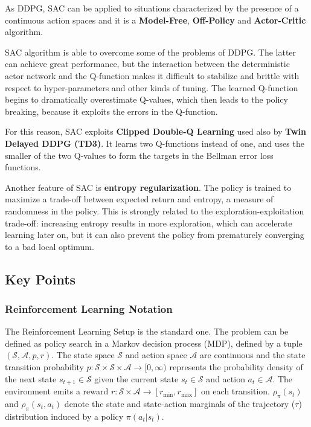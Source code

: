 \documentclass[a4paper, 11pt]{article}
\begin{document}
	As DDPG, SAC can be applied to situations characterized by the presence of a continuous action spaces and it is a \textbf{Model-Free}, \textbf{Off-Policy} and \textbf{Actor-Critic} algorithm.
	
	SAC algorithm is able to overcome some of the problems of DDPG.
	The latter can achieve great performance, but the interaction between the deterministic actor network and the Q-function makes it difficult to stabilize and brittle with respect to hyper-parameters and other kinds of tuning. The learned Q-function begins to dramatically overestimate Q-values, which then leads to the policy breaking, because it exploits the errors in the Q-function.
	
	For this reason, SAC exploits \textbf{Clipped Double-Q Learning} used also by \textbf{Twin Delayed DDPG (TD3)}. It learns two Q-functions instead of one, and uses the smaller of the two Q-values to form the targets in the Bellman error loss functions.
	
	Another feature of SAC is \textbf{entropy regularization}. The policy is trained to maximize a trade-off between expected return and entropy, a measure of randomness in the policy. This is strongly related to the exploration-exploitation trade-off: increasing entropy results in more exploration, which can accelerate learning later on, but it can also prevent the policy from prematurely converging to a bad local optimum.
	
	\subsection{Key Points}
	\subsubsection{Reinforcement Learning Notation}
	The Reinforcement Learning Setup is the standard one. The problem can be defined as policy search in a Markov decision process (MDP), defined by a tuple $(\mathcal{S}, \mathcal{A}, p, r)$. The state space $\mathcal{S}$ and action space $\mathcal{A}$ are continuous and the state transition probability $p : \mathcal{S} \times \mathcal{S} \times \mathcal{A} \rightarrow [0,\infty)$ represents the probability density of the next state $s_{t+1} \in \mathcal{S}$ given the current state $s_t \in \mathcal{S}$ and action $a_t \in \mathcal{A}$. The environment emits a reward $r: \mathcal{S} \times \mathcal{A} \rightarrow [r_{\min}, r_{\max}]$ on each transition. $\rho_\pi(s_t)$ and $\rho_\pi(s_t, a_t)$ denote the state and state-action marginals of the trajectory ($\tau$) distribution induced by a policy $\pi(a_t|s_t)$.
	
\end{document}
